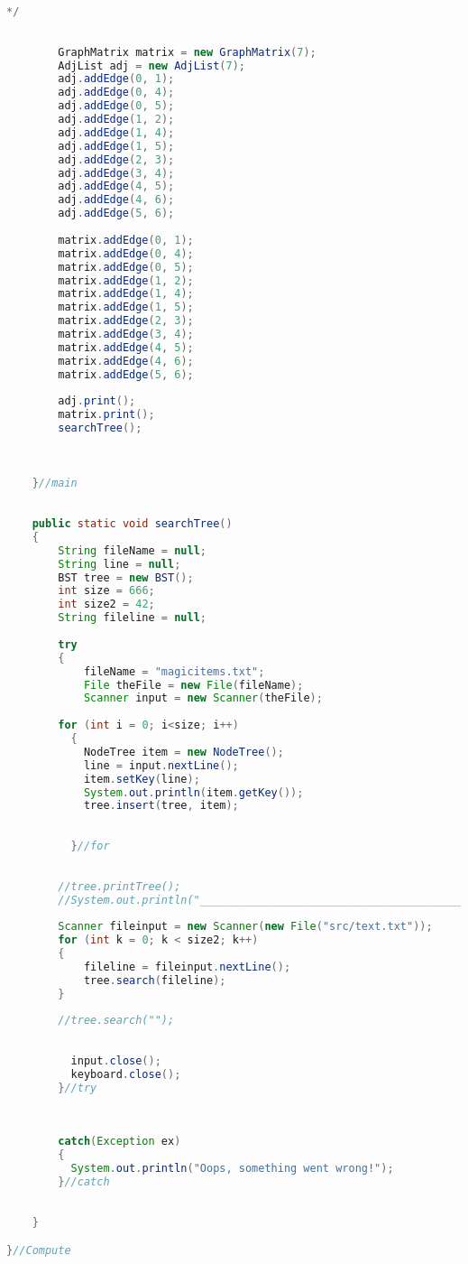 \documentclass[letterpaper, 10pt]{article}
\begin{document}
\begin{lstlisting}[language = java]
	    */
	    
		
		GraphMatrix matrix = new GraphMatrix(7);
		AdjList adj = new AdjList(7);
		adj.addEdge(0, 1);
		adj.addEdge(0, 4);
		adj.addEdge(0, 5);
		adj.addEdge(1, 2);
		adj.addEdge(1, 4);
		adj.addEdge(1, 5);
		adj.addEdge(2, 3);
		adj.addEdge(3, 4);
		adj.addEdge(4, 5);
		adj.addEdge(4, 6);
		adj.addEdge(5, 6);
		
		matrix.addEdge(0, 1);
		matrix.addEdge(0, 4);
		matrix.addEdge(0, 5);
		matrix.addEdge(1, 2);
		matrix.addEdge(1, 4);
		matrix.addEdge(1, 5);
		matrix.addEdge(2, 3);
		matrix.addEdge(3, 4);
		matrix.addEdge(4, 5);
		matrix.addEdge(4, 6);
		matrix.addEdge(5, 6);
		
		adj.print();
		matrix.print();
		searchTree();
		
	    

	}//main
	
	
	public static void searchTree()
    {
		String fileName = null;
	    String line = null;
	    BST tree = new BST();
	    int size = 666;
	    int size2 = 42;
	    String fileline = null;
	        
	    try
	    { 
	    	fileName = "magicitems.txt";
	    	File theFile = new File(fileName);
	    	Scanner input = new Scanner(theFile);
	                 
	    for (int i = 0; i<size; i++)
	      {
	    	NodeTree item = new NodeTree();
	    	line = input.nextLine();
	    	item.setKey(line);
	    	System.out.println(item.getKey());
	    	tree.insert(tree, item);
	    	
	    	
	      }//for
	    
	    
	    //tree.printTree();
    	//System.out.println("______________________________________________");
	    
	    Scanner fileinput = new Scanner(new File("src/text.txt"));
	    for (int k = 0; k < size2; k++)
	    {
	    	fileline = fileinput.nextLine();
	    	tree.search(fileline);
	    }
	    
	    //tree.search("");
	    
	    
	      input.close();
	      keyboard.close();
	    }//try
	    
	    
	    
	    catch(Exception ex)
	    {
	      System.out.println("Oops, something went wrong!");
	    }//catch
	    
	    
    }

}//Compute


\end{lstlisting}
\end{document}
